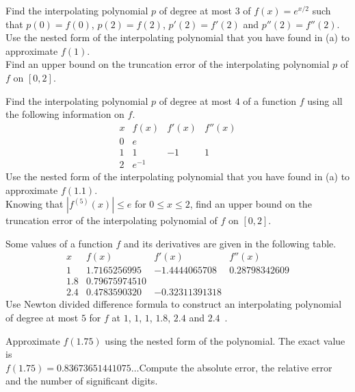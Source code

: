 \begin{question}
 Find the interpolating polynomial $p$ of degree at most $3$
of $f(x) = e^{x/2}$ such that
$p(0) = f(0)$, $p(2) = f(2)$, $p'(2) = f'(2)$ and $p''(2) = f''(2)$.\\
 Use the nested form of the interpolating polynomial that you
have found in (a) to approximate $f(1)$.\\
 Find an upper bound on the truncation error of the interpolating
polynomial $p$ of $f$ on $[0,2]$.
\label{intAQ8}
\end{question}

\begin{question}
 Find the interpolating polynomial $p$ of degree at most $4$
of a function $f$ using all the following information on $f$.
\[
\begin{array}{c|c|c|c}
x & f(x) & f'(x) & f''(x) \\
\hline
0 & e & & \\
1 & 1 & -1 & 1 \\
2 & e^{-1} & &
\end{array}
\]
 Use the nested form of the interpolating polynomial that you
have found in (a) to approximate $f(1.1)$.\\
 Knowing that $|f^{(5)}(x)| \leq e$ for $0\leq x\leq 2$, find
an upper bound on the truncation error of the interpolating polynomial
of $f$ on $[0,2]$.
\label{intAQ9}
\end{question}

\begin{question}
Some values of a function $f$ and its derivatives are given in the
following table.
\[
\begin{array}{c|c|c|c}
x & f(x) & f'(x) & f''(x) \\
\hline
 1  & 1.7165256995 & -1.4444065708 & 0.28798342609 \\
1.8 & 0.79675974510 & & \\
2.4 & 0.4783590320 & -0.32311391318 &
\end{array}
\]
Use Newton divided difference formula to construct an
interpolating polynomial of degree at most $5$ for $f$ at
$1$, $1$, $1$, $1.8$, $2.4$ and $2.4$\ .

Approximate $f(1.75)$ using the nested form of the polynomial.
The exact value is\\ $f(1.75) = 0.83673651441075\ldots$\quad  Compute the
absolute error, the relative error and the number of significant
digits.
\label{intAQ10}
\end{question}

